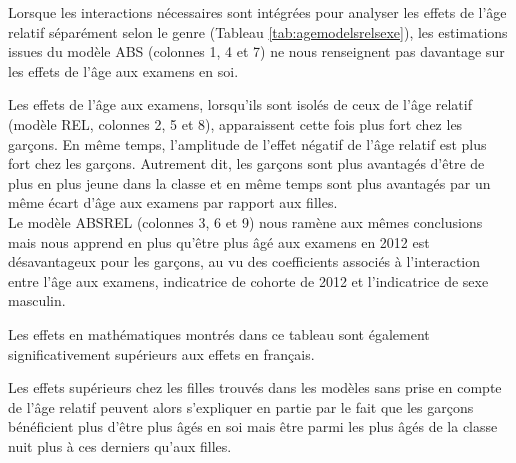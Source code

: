 \documentclass[
]{book}
\begin{document}
\quad Lorsque les interactions nécessaires sont intégrées pour analyser les effets de l'âge relatif séparément selon le genre (Tableau \ref{tab:agemodelsrelsexe}), les estimations issues du modèle ABS (colonnes 1, 4 et 7) ne nous renseignent pas davantage sur les effets de l'âge aux examens en soi.

Les effets de l'âge aux examens, lorsqu'ils sont isolés de ceux de l'âge relatif (modèle REL, colonnes 2, 5 et 8), apparaissent cette fois plus fort chez les garçons. En même temps, l'amplitude de l'effet négatif de l'âge relatif est plus fort chez les garçons. Autrement dit, les garçons sont plus avantagés d'être de plus en plus jeune dans la classe et en même temps sont plus avantagés par un même écart d'âge aux examens par rapport aux filles.\\
\quad Le modèle ABSREL (colonnes 3, 6 et 9) nous ramène aux mêmes conclusions mais nous apprend en plus qu'être plus âgé aux examens en 2012 est désavantageux pour les garçons, au vu des coefficients associés à l'interaction entre l'âge aux examens, indicatrice de cohorte de 2012 et l'indicatrice de sexe masculin.

\quad Les effets en mathématiques montrés dans ce tableau sont également significativement supérieurs aux effets en français.

\quad Les effets supérieurs chez les filles trouvés dans les modèles sans prise en compte de l'âge relatif peuvent alors s'expliquer en partie par le fait que les garçons bénéficient plus d'être plus âgés en soi mais être parmi les plus âgés de la classe nuit plus à ces derniers qu'aux filles.
\end{document}
